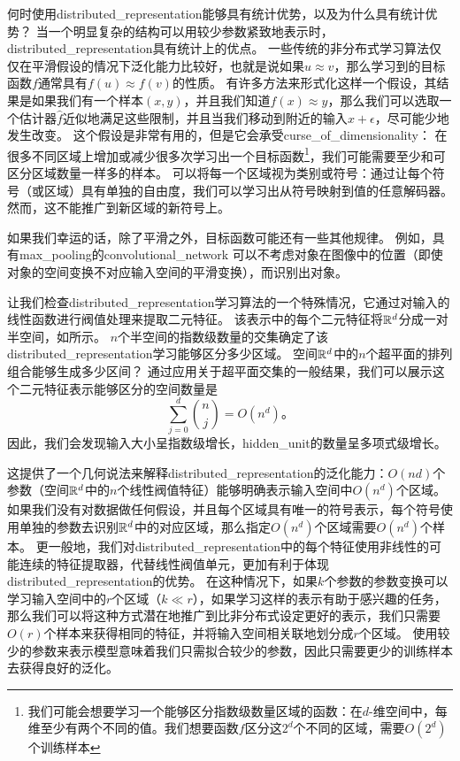 何时使用\gls{distributed_representation}能够具有统计优势，以及为什么具有统计优势？
当一个明显复杂的结构可以用较少参数紧致地表示时，\gls{distributed_representation}具有统计上的优点。
一些传统的非分布式学习算法仅仅在平滑假设的情况下泛化能力比较好，也就是说如果$u\approx v$，那么学习到的目标函数$f$通常具有$f(u) \approx f(v)$的性质。
有许多方法来形式化这样一个假设，其结果是如果我们有一个样本$(x,y)$，并且我们知道$f(x) \approx y$，那么我们可以选取一个估计器$\hat{f}$近似地满足这些限制，并且当我们移动到附近的输入$x + \epsilon$，尽可能少地发生改变。
这个假设是非常有用的，但是它会承受\gls{curse_of_dimensionality}：
在很多不同区域上增加或减少很多次学习出一个目标函数\footnote{我们可能会想要学习一个能够区分指数级数量区域的函数：在$d$-维空间中，每维至少有两个不同的值。我们想要函数$f$区分这$2^d$个不同的区域，需要$O(2^d)$个训练样本}，我们可能需要至少和可区分区域数量一样多的样本。
可以将每一个区域视为类别或符号：通过让每个符号（或区域）具有单独的自由度，我们可以学习出从符号映射到值的任意解码器。
然而，这不能推广到新区域的新符号上。


如果我们幸运的话，除了平滑之外，目标函数可能还有一些其他规律。
例如，具有\gls{max_pooling}的\gls{convolutional_network}
可以不考虑对象在图像中的位置（即使对象的空间变换不对应输入空间的平滑变换），而识别出对象。


让我们检查\gls{distributed_representation}学习算法的一个特殊情况，它通过对输入的线性函数进行阀值处理来提取二元特征。
该表示中的每个二元特征将$\mathbb{R}^d$分成一对半空间，如所示。
$n$个半空间的指数级数量的交集确定了该\gls{distributed_representation}学习能够区分多少区域。
空间$\mathbb{R}^d$中的$n$个超平面的排列组合能够生成多少区间？
通过应用关于超平面交集的一般结果\citep{Zaslavsky-1975}，我们可以展示\citep{Pascanu+et+al-ICLR2014b}这个二元特征表示能够区分的空间数量是
\begin{equation}
	\sum_{j=0}^d \binom{n}{j} = O(n^d)。
\end{equation}
因此，我们会发现输入大小呈指数级增长，\gls{hidden_unit}的数量呈多项式级增长。


这提供了一个几何说法来解释\gls{distributed_representation}的泛化能力：$O(nd)$个参数（空间$\mathbb{R}^d$中的$n$个线性阀值特征）能够明确表示输入空间中$O(n^d)$个区域。
如果我们没有对数据做任何假设，并且每个区域具有唯一的符号表示，每个符号使用单独的参数去识别$\mathbb{R}^d$中的对应区域，那么指定$O(n^d)$个区域需要$O(n^d)$个样本。
更一般地，我们对\gls{distributed_representation}中的每个特征使用非线性的可能连续的特征提取器，代替线性阀值单元，更加有利于体现\gls{distributed_representation}的优势。
在这种情况下，如果$k$个参数的参数变换可以学习输入空间中的$r$个区域（$k\ll r$），如果学习这样的表示有助于感兴趣的任务，那么我们可以将这种方式潜在地推广到比非分布式设定更好的表示，我们只需要$O(r)$个样本来获得相同的特征，并将输入空间相关联地划分成$r$个区域。
使用较少的参数来表示模型意味着我们只需拟合较少的参数，因此只需要更少的训练样本去获得良好的泛化。


